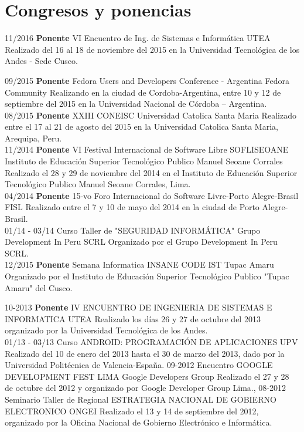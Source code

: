 \documentclass[]{friggeri-cv}
\begin{document}
\section{Congresos y ponencias}
\begin{entrylist}
  \entry
    {11/2016}
    {\textbf{Ponente} VI Encuentro de Ing. de Sistemas e Inform\'atica }
    {UTEA}
    {Realizado del 16 al 18 de noviembre del 2015 en la Universidad Tecnológica de los Andes - Sede Cusco.\\}
\end{entrylist}
\begin{entrylist}
    \entry
    {09/2015}
    {\textbf{Ponente} Fedora Users and Developers Conference - Argentina}
    {Fedora Community}
    {Realizando en la ciudad de Cordoba-Argentina, entre 10 y 12 de septiembre
    del 2015 en la Universidad Nacional de C\'ordoba – Argentina.\\}
    \entry
    {08/2015}
    {\textbf{Ponente} {XXIII CONEISC}}
    {Universidad Catolica Santa Maria}
    {Realizado entre el 17 al 21 de agosto del 2015 en la Universidad Catolica Santa Maria, Arequipa, Peru.\\}
    \entry
    {11/2014}
    {\textbf{Ponente} VI Festival Internacional de Software Libre SOFLISEOANE}
    {Instituto de Educaci\'on Superior Tecnol\'ogico Publico Manuel Seoane Corrales}
    {Realizado el 28 y 29 de noviembre del 2014 en el Instituto de Educaci\'on Superior
    Tecnol\'ogico Publico Manuel Seoane Corrales, Lima.\\}
    \entry
    {04/2014}
    {\textbf{Ponente} 15-vo Foro Internacional do Software Livre-Porto Alegre-Brasil}
    {FISL}
    {Realizado entre el 7 y 10 de mayo del 2014 en la ciudad de Porto Alegre-Brasil.\\}
    \entry
    {01/14 - 03/14}
    {Curso Taller de "SEGURIDAD INFORM\'ATICA"}
    {Grupo Development In Peru SCRL}
    {Organizado por el Grupo Development In Peru SCRL.\\}
    \entry
    {12/2015}
    {\textbf{Ponente} Semana Informatica INSANE CODE}
    {IST Tupac Amaru}
    {Organizado por el Instituto de Educaci\'on Superior Tecnol\'ogico Publico "Tupac
    Amaru" del Cusco.}
\end{entrylist}
\begin{entrylist}
    \entry
    {10-2013}
    {\textbf{Ponente} IV ENCUENTRO DE INGENIERIA DE SISTEMAS E INFORMATICA}
    {UTEA}
    {Realizado los d\'ias 26 y 27 de octubre del 2013 organizado por la Universidad
    Tecnol\'ogica de los Andes.\\}
    \entry
    {01/13 - 03/13}
    {Curso ANDROID{:} PROGRAMACI\'ON DE APLICACIONES}
    {UPV}
    {Realizado del 10 de enero del 2013 hasta el 30 de marzo del 2013, dado por
    la Universidad Polit\'ecnica de Valencia-Espa\~na.}
    \entry
    {09-2012}
    {Encuentro GOOGLE DEVELOPMENT FEST LIMA}
    {Google Developers Group}
    {Realizado el 27 y 28 de octubre del 2012 y organizado por Google Developer Group Lima.},
    \entry
    {08-2012}
    {Seminario Taller de Regional ESTRATEGIA NACIONAL DE GOBIERNO ELECTRONICO}
    {ONGEI}
    {Realizado el 13 y 14 de septiembre del 2012, organizado por la Oficina
    Nacional de Gobierno Electr\'onico e Inform\'atica.}
\end{entrylist}
\newpage
\end{document}
